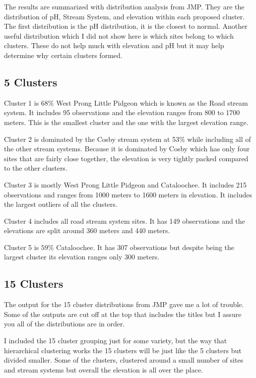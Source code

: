 The results are summarized with distribution analysis from JMP.  They are the distribution of pH, Stream System, and elevation within each proposed cluster.  The first distribution is the pH distribution, it is the closest to normal.  Another useful distribution which I did not show here is which sites belong to which clusters. These do not help much with elevation and pH but it may help determine why certain clusters formed.

\subsection{5 Clusters}
Cluster 1 is $68\%$ West Prong Little Pidgeon which is known as the Road stream system.  It includes 95 observations and the elevation ranges from 800 to 1700 meters.  This is the smallest cluster and the one with the largest elevation range.

Cluster 2 is dominated by the Cosby stream system at 53$\%$ while including all of the other stream systems.   Because it is dominated by Cosby which has only four sites that are fairly close together, the elevation is very tightly packed compared to the other clusters.

Cluster 3 is mostly West Prong Little Pidgeon and Cataloochee.  It includes 215 observations and ranges from 1000 meters to 1600 meters in elevation.  It includes the largest outliers of all the clusters.

Cluster 4 includes all road stream system sites.  It has 149 observations and the elevations are split around 360 meters and 440 meters.

Cluster 5 is $59\%$ Cataloochee.  It has 307 observations but despite being the largest cluster its elevation ranges only 300 meters.

\subsection{15 Clusters}
The output for the 15 cluster distributions from JMP gave me a lot of trouble.  Some of the outputs are cut off at the top that includes the titles but I assure you all of the distributions are in order.

I included the 15 cluster grouping just for some variety, but the way that hierarchical clustering works the 15 clusters will be just like the 5 clusters but divided smaller.  Some of the clusters, clustered around a small number of sites and stream systems but overall the elevation is all over the place.

